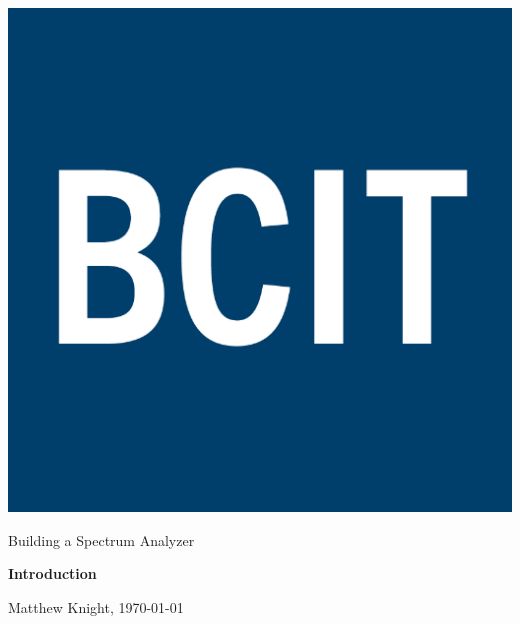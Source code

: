 \documentclass[12pt]{article}
\begin{document}
 

\thispagestyle{titlePage}

\includegraphics[scale=0.12]{BCIT}
\bigskip

\begin{center}
    
    {\fontsize{24pt}{6pt}\selectfont Building a Spectrum 
    	Analyzer}
    
    \vspace{12pt}
    
    {\fontsize{28pt}{12pt}\selectfont\bfseries Introduction}
    
    \vspace{12pt}
    
    {\fontsize{26pt}{12pt}\selectfont\bfseries\itshape}
    
    \vspace{12pt}
    
    {\fontsize{16pt}{12pt}\selectfont Matthew Knight, \today}
    
    \vspace{24pt}

\end{center}

\pagebreak

\pagestyle{neilReport}

\tableofcontents

\pagebreak



\pagebreak



\pagebreak

{}


\pagebreak

\begin{appendix}



\end{appendix}
\end{document}
